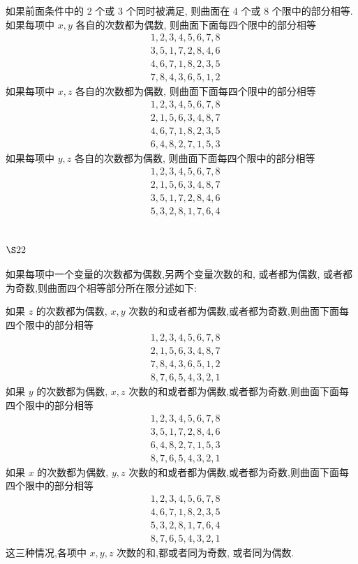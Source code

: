 如果前面条件中的 2 个或 3 个同时被满足, 则曲面在 4 个或 8 个限中的部分相等. 如果每项中 $x, y$ 各自的次数都为偶数, 则曲面下面每四个限中的部分相等
\[
\begin{aligned}
& 1,2,3,4,5,6,7,8 \\
& 3,5,1,7,2,8,4,6
\end{aligned}
\]
\[
\begin{aligned}
& 4,6,7,1,8,2,3,5 \\
& 7,8,4,3,6,5,1,2
\end{aligned}
\]
如果每项中 $x, z$ 各自的次数都为偶数, 则曲面下面每四个限中的部分相等
\[
\begin{aligned}
& 1,2,3,4,5,6,7,8 \\
& 2,1,5,6,3,4,8,7 \\
& 4,6,7,1,8,2,3,5 \\
& 6,4,8,2,7,1,5,3
\end{aligned}
\]
如果每项中 $y, z$ 各自的次数都为偶数, 则曲面下面每四个限中的部分相等
\[
\begin{aligned}
& 1,2,3,4,5,6,7,8 \\
& 2,1,5,6,3,4,8,7 \\
& 3,5,1,7,2,8,4,6 \\
& 5,3,2,8,1,7,6,4
\end{aligned}
\]
\section{$\S 22$}

如果每项中一个变量的次数都为偶数,另两个变量次数的和, 或者都为偶数, 或者都 为奇数,则曲面四个相等部分所在限分述如下:

如果 $z$ 的次数都为偶数, $x, y$ 次数的和或者都为偶数,或者都为奇数,则曲面下面每 四个限中的部分相等
\[
\begin{aligned}
& 1,2,3,4,5,6,7,8 \\
& 2,1,5,6,3,4,8,7 \\
& 7,8,4,3,6,5,1,2 \\
& 8,7,6,5,4,3,2,1
\end{aligned}
\]
如果 $y$ 的次数都为偶数, $x, z$ 次数的和或者都为偶数,或者都为奇数,则曲面下面每 四个限中的部分相等
\[
\begin{aligned}
& 1,2,3,4,5,6,7,8 \\
& 3,5,1,7,2,8,4,6 \\
& 6,4,8,2,7,1,5,3 \\
& 8,7,6,5,4,3,2,1
\end{aligned}
\]
如果 $x$ 的次数都为偶数, $y, z$ 次数的和或者都为偶数,或者都为奇数,则曲面下面每 四个限中的部分相等
\[
\begin{aligned}
& 1,2,3,4,5,6,7,8 \\
& 4,6,7,1,8,2,3,5 \\
& 5,3,2,8,1,7,6,4 \\
& 8,7,6,5,4,3,2,1
\end{aligned}
\]
这三种情况,各项中 $x, y, z$ 次数的和,都或者同为奇数, 或者同为偶数. 


